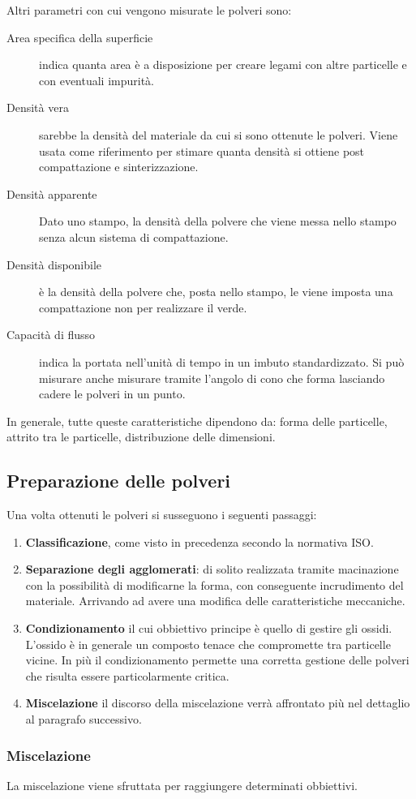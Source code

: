 Altri parametri con cui vengono misurate le polveri sono:
\begin{description}
\item[Area specifica della superficie] indica quanta area è a disposizione per creare legami con altre particelle e con eventuali impurità.
\item[Densità vera] sarebbe la densità del materiale da cui si sono ottenute le polveri.
Viene usata come riferimento per stimare quanta densità si ottiene post compattazione e sinterizzazione.
\item[Densità apparente] Dato uno stampo, la densità della polvere che viene messa nello stampo senza alcun sistema di compattazione.
\item[Densità disponibile] è la densità della polvere che, posta nello stampo, le viene imposta una compattazione non per realizzare il verde.
\item[Capacità di flusso] indica la portata nell'unità di tempo in un imbuto standardizzato.
Si può misurare anche misurare tramite l'angolo di cono che forma lasciando cadere le polveri in un punto.
\end{description}

In generale, tutte queste caratteristiche dipendono da: forma delle particelle, attrito tra le particelle, distribuzione delle dimensioni.

\subsection{Preparazione delle polveri}
Una volta ottenuti le polveri si susseguono i seguenti passaggi:
\begin{enumerate}
\item \textbf{Classificazione}, come visto in precedenza secondo la normativa ISO.
\item \textbf{Separazione degli agglomerati}: di solito realizzata tramite macinazione con la possibilità di modificarne la forma, con conseguente incrudimento del materiale. Arrivando ad avere una modifica delle caratteristiche meccaniche.
\item \textbf{Condizionamento} il cui obbiettivo principe è quello di gestire gli ossidi.
L'ossido è in generale un composto tenace che compromette tra particelle vicine.
In più il condizionamento permette una corretta gestione delle polveri che risulta essere particolarmente critica.
\item \textbf{Miscelazione} il discorso della miscelazione verrà affrontato più nel dettaglio al paragrafo successivo.
\end{enumerate}

\subsubsection{Miscelazione}
La miscelazione viene sfruttata per raggiungere determinati obbiettivi.\